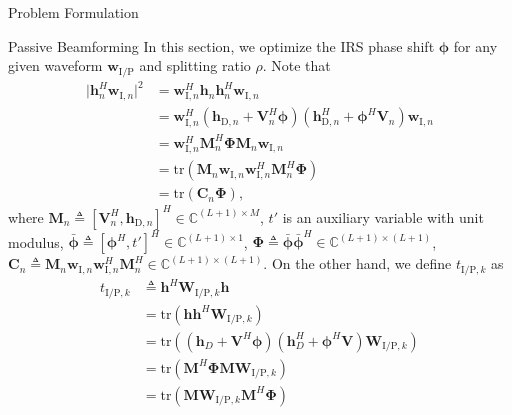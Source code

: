 \documentclass[journal]{IEEEtran}
\begin{document}
\begin{section}{Problem Formulation}
		\begin{subsection}{Passive Beamforming}
			In this section, we optimize the IRS phase shift $\boldsymbol{\phi}$ for any given waveform $\boldsymbol{w}_{\mathrm{I/P}}$ and splitting ratio $\rho$. Note that
			\begin{align}
				\lvert \boldsymbol{h}_{n}^H\boldsymbol{w}_{\mathrm{I},n} \rvert^2
				& = \boldsymbol{w}_{\mathrm{I},n}^H\boldsymbol{h}_n\boldsymbol{h}_n^H\boldsymbol{w}_{\mathrm{I},n}\nonumber\\
				& = \boldsymbol{w}_{\mathrm{I},n}^H(\boldsymbol{h}_{\mathrm{D},n}+\boldsymbol{V}_n^H\boldsymbol{\phi})(\boldsymbol{h}_{\mathrm{D},n}^H+\boldsymbol{\phi}^H\boldsymbol{V}_n)\boldsymbol{w}_{\mathrm{I},n}\nonumber\\
				& = \boldsymbol{w}_{\mathrm{I},n}^H\boldsymbol{M}_n^H\boldsymbol{\Phi}\boldsymbol{M}_n\boldsymbol{w}_{\mathrm{I},n}\nonumber\\
				& = \mathrm{tr}(\boldsymbol{M}_n\boldsymbol{w}_{\mathrm{I},n}\boldsymbol{w}_{\mathrm{I},n}^H\boldsymbol{M}_n^H\boldsymbol{\Phi})\nonumber\\
				& = \mathrm{tr}(\boldsymbol{C}_n\boldsymbol{\Phi}),
			\end{align}
			where $\boldsymbol{M}_n \triangleq [\boldsymbol{V}_n^H, \boldsymbol{h}_{\mathrm{D},n}]^H \in \mathbb{C}^{(L+1) \times M}$, $t'$ is an auxiliary variable with unit modulus, $\bar{\boldsymbol{\phi}} \triangleq [\boldsymbol{\phi}^H, t']^H \in \mathbb{C}^{(L+1) \times 1}$, $\boldsymbol{\Phi} \triangleq \bar{\boldsymbol{\phi}}\bar{\boldsymbol{\phi}}^H \in \mathbb{C}^{(L+1) \times (L+1)}$, $\boldsymbol{C}_n \triangleq \boldsymbol{M}_n\boldsymbol{w}_{\mathrm{I},n}\boldsymbol{w}_{\mathrm{I},n}^H\boldsymbol{M}_n^H \in \mathbb{C}^{(L+1)\times(L+1)}$. On the other hand, we define $t_{\mathrm{I/P},k}$ as
			\begin{align}
				t_{\mathrm{I/P},k}
				& \triangleq \boldsymbol{h}^H\boldsymbol{W}_{\mathrm{I/P},k}\boldsymbol{h}\nonumber\\
				& = \mathrm{tr}(\boldsymbol{h}\boldsymbol{h}^H\boldsymbol{W}_{\mathrm{I/P},k})\nonumber\\
				& = \mathrm{tr}\left((\boldsymbol{h}_{D}+\boldsymbol{V}^H\boldsymbol{\phi})(\boldsymbol{h}_{D}^H+\boldsymbol{\phi}^H\boldsymbol{V})\boldsymbol{W}_{\mathrm{I/P},k}\right)\nonumber\\
				& = \mathrm{tr}(\boldsymbol{M}^H\boldsymbol{\Phi}\boldsymbol{M}\boldsymbol{W}_{\mathrm{I/P},k})\nonumber\\
				& = \mathrm{tr}(\boldsymbol{M}\boldsymbol{W}_{\mathrm{I/P},k}\boldsymbol{M}^H\boldsymbol{\Phi})\nonumber\\

\end{align}
\end{subsection}
\end{section}
\end{document}
